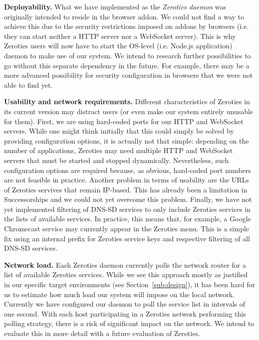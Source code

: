 \textbf{Deployability.}
What we have implemented as the \textit{Zeroties daemon} was originally intended to reside in the browser addon.
We could not find a way to achieve this due to the security restrictions imposed on addons by browsers (i.e. they can start neither a HTTP server nor a WebSocket server).
This is why Zeroties users will now have to start the OS-level (i.e. Node.js application) daemon to make use of our system.
We intend to research further possibilities to go without this separate dependency in the future.
For example, there may be a more advanced possibility for security configuration in browsers that we were not able to find yet.

\textbf{Usability and network requirements.}
Different characteristics of Zeroties in its current version may distract users (or even make our system entirely unusable for them). 
First, we are using hard-coded ports for our HTTP and WebSocket servers.
While one might think initially that this could simply be solved by providing configuration options, it is actually not that simple: depending on the number of applications, Zeroties may need multiple HTTP and WebSocket servers that must be started and stopped dynamically.
Nevertheless, such configuration options are required because, as obvious, hard-coded port numbers are not feasible in practice.
Another problem in terms of usability are the URLs of Zeroties servives that remain IP-based.
This has already been a limitation in Successorships and we could not yet overcome this problem.
Finally, we have not yet implemented filtering of DNS-SD services to only include Zeroties services in the lists of available services.
In practice, this means that, for example, a Google Chromecast service may currently appear in the Zeroties menu.
This is a simple fix using an internal prefix for Zeroties service keys and respective filtering of all DNS-SD services.

\textbf{Network load.}
Each Zeroties daemon currently polls the network router for a list of available Zeroties services.
While we see this approach mostly as justified in our specific target environments (see Section~\ref{sub:design}), it has been hard for us to estimate how much load our system will impose on the local network.
Currently we have configured our daemon to poll the service list in intervals of one second.
With each host participating in a Zeroties network performing this polling strategy, there is a risk of significant impact on the network.
We intend to evaluate this in more detail with a future evaluation of Zeroties.




